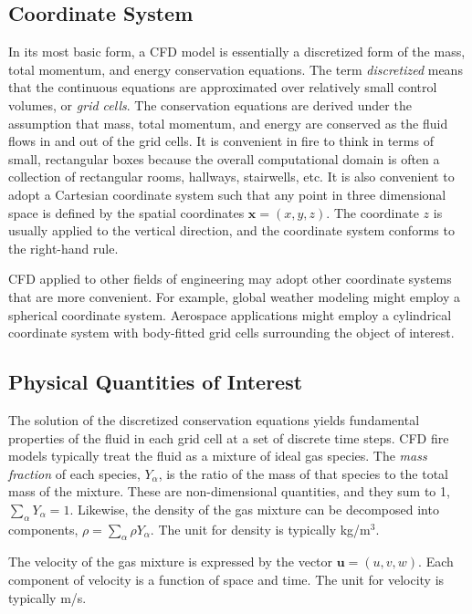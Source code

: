 \documentclass[graybox]{svmult}
\begin{document}
\subsection{Coordinate System}

In its most basic form, a CFD model is essentially a discretized form of the mass, total momentum, and energy conservation equations. The term {\em discretized} means that the continuous equations are approximated over relatively small control volumes, or {\em grid cells}. The conservation equations are derived under the assumption that mass, total momentum, and energy are conserved as the fluid flows in and out of the grid cells. It is convenient in fire to think in terms of small, rectangular boxes because the overall computational domain is often a collection of rectangular rooms, hallways, stairwells, etc. It is also convenient to adopt a Cartesian coordinate system such that any point in three dimensional space is defined by the spatial coordinates $\mathbf{x}=(x,y,z)$. The coordinate $z$ is usually applied to the vertical direction, and the coordinate system conforms to the right-hand rule.

CFD applied to other fields of engineering may adopt other coordinate systems that are more convenient. For example, global weather modeling might employ a spherical coordinate system. Aerospace applications might employ a cylindrical coordinate system with body-fitted grid cells surrounding the object of interest.


\subsection{Physical Quantities of Interest}

The solution of the discretized conservation equations yields fundamental properties of the fluid in each grid cell at a set of discrete time steps. CFD fire models typically treat the fluid as a mixture of ideal gas species. The {\em mass fraction} of each species, $Y_\alpha$, is the ratio of the mass of that species to the total mass of the mixture. These are non-dimensional quantities, and they sum to 1, $\sum_\alpha Y_\alpha = 1$. Likewise, the density of the gas mixture can be decomposed into components, $\rho = \sum_\alpha \rho Y_\alpha$. The unit for density is typically kg/m$^3$.

The velocity of the gas mixture is expressed by the vector $\mathbf{u}=(u,v,w)$. Each component of velocity is a function of space and time. The unit for velocity is typically m/s.
\end{document}
